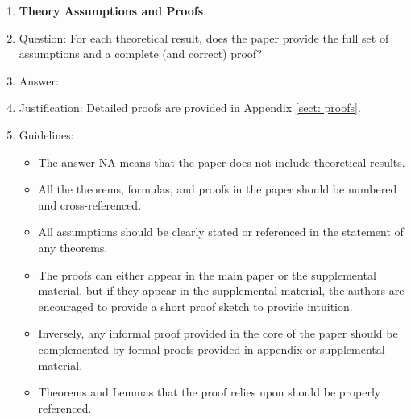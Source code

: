 \documentclass{article}
\theoremstyle{plain}
\theoremstyle{definition}
\theoremstyle{remark}
\begin{document}
\begin{enumerate}
\begin{itemize}
        \item While the authors might fear that complete honesty about limitations might be used by reviewers as grounds for rejection, a worse outcome might be that reviewers discover limitations that aren't acknowledged in the paper. The authors should use their best judgment and recognize that individual actions in favor of transparency play an important role in developing norms that preserve the integrity of the community. Reviewers will be specifically instructed to not penalize honesty concerning limitations.
    \end{itemize}

\item {\bf Theory Assumptions and Proofs}
    \item[] Question: For each theoretical result, does the paper provide the full set of assumptions and a complete (and correct) proof?
    \item[] Answer: \answerYes{}{} %
    \item[] Justification: Detailed proofs are provided in Appendix \ref{sect: proofs}.
    \item[] Guidelines:
    \begin{itemize}
        \item The answer NA means that the paper does not include theoretical results. 
        \item All the theorems, formulas, and proofs in the paper should be numbered and cross-referenced.
        \item All assumptions should be clearly stated or referenced in the statement of any theorems.
        \item The proofs can either appear in the main paper or the supplemental material, but if they appear in the supplemental material, the authors are encouraged to provide a short proof sketch to provide intuition. 
        \item Inversely, any informal proof provided in the core of the paper should be complemented by formal proofs provided in appendix or supplemental material.
        \item Theorems and Lemmas that the proof relies upon should be properly referenced. 
    \end{itemize}


\end{enumerate}
\end{document}

